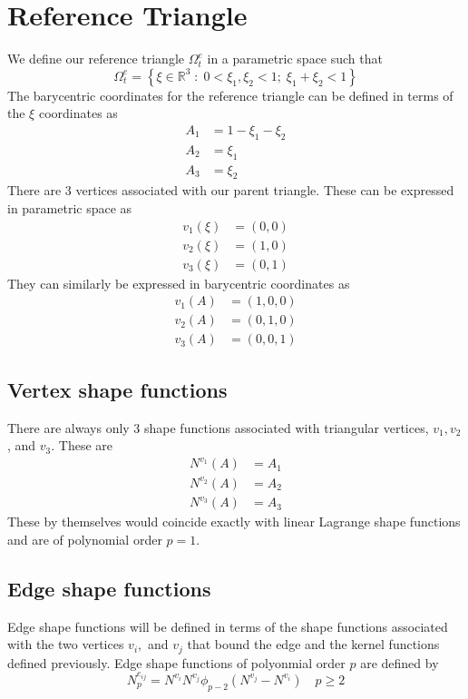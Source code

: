 \documentclass{article}
\begin{document}
\section{Reference Triangle}
We define our reference triangle $\Omega^e_t$ in a parametric space such that
\[
\Omega^e_t = \left\{ \xi \in \mathbb{R}^3 \; : \;
0 < \xi_1, \xi_2 < 1; \; \xi_1 + \xi_2 < 1 \right\}
\]
The barycentric coordinates for the reference triangle can be defined in
terms of the $\xi$ coordinates as
\begin{align*}
A_1 &= 1 - \xi_1 - \xi_2 \\
A_2 &= \xi_1 \\
A_3 &= \xi_2
\end{align*}
There are 3 vertices associated with our parent triangle. These can be
expressed in parametric space as
\begin{align*}
v_1(\xi) &= (0,0) \\
v_2(\xi) &= (1,0) \\
v_3(\xi) &= (0,1)
\end{align*}
They can similarly be expressed in barycentric coordinates as
\begin{align*}
v_1(A) &= (1,0,0) \\
v_2(A) &= (0,1,0) \\
v_3(A) &= (0,0,1)
\end{align*}

\subsection{Vertex shape functions}

There are always only 3 shape functions associated with triangular vertices, 
$v_1, v_2$, and $v_3$.
These are
\begin{align*}
N^{v_1}(A) &= A_1 \\
N^{v_2}(A) &= A_2 \\
N^{v_3}(A) &= A_3
\end{align*}
These by themselves would coincide exactly with linear Lagrange shape
functions and are of polynomial order $p=1$.

\subsection{Edge shape functions}
Edge shape functions will be defined in terms of the shape functions
associated with the two vertices $v_i,$ and $v_j$ that bound the edge and the
kernel functions defined previously. Edge shape functions of polyonmial order
$p$ are defined by
\[
N^{e_{ij}}_p = N^{v_i} N^{v_j} \phi_{p-2}(N^{v_j} - N^{v_i})
\quad p \geq 2
\]
\end{document}
